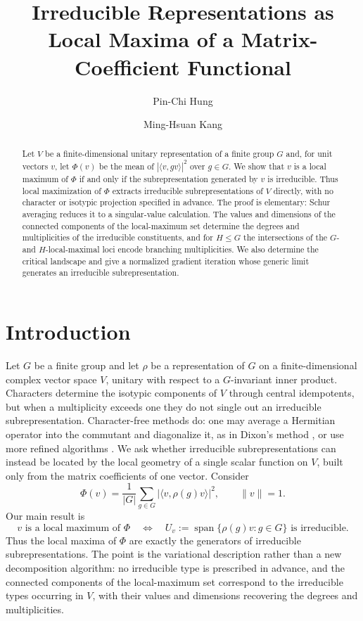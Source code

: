 \documentclass{amsart}
\title[Irreducible representations as local maxima]{Irreducible Representations as Local Maxima of a Matrix-Coefficient Functional}
\author{Pin-Chi Hung}
\author{Ming-Hsuan Kang}
\theoremstyle{remark}
\DeclareMathOperator{\Span}{span}
\newcommand{\norm}[1]{\lVert #1\rVert}
\begin{document}
 
\begin{abstract}
Let $V$ be a finite-dimensional unitary representation of a finite group $G$ and, for unit vectors
$v$, let $\Phi(v)$ be the mean of $|\langle v,gv\rangle|^2$ over $g\in G$. We show that $v$ is a local
maximum of $\Phi$ if and only if the subrepresentation generated by $v$ is irreducible. Thus local
maximization of $\Phi$ extracts irreducible subrepresentations of $V$ directly, with no character or
isotypic projection specified in advance. The proof is elementary: Schur averaging reduces it to a
singular-value calculation.
The values and dimensions of the connected components of the local-maximum set determine the degrees
and multiplicities of the irreducible constituents, and for $H\le G$ the intersections of the $G$- and $H$-local-maximal loci
encode branching multiplicities. We also determine the critical landscape and give a normalized
gradient iteration whose generic limit generates an irreducible subrepresentation.
\end{abstract}
\maketitle
 
\section{Introduction}
 
Let $G$ be a finite group and let $\rho$ be a representation of $G$ on a finite-dimensional complex
vector space $V$, unitary with respect to a $G$-invariant inner product. Characters determine the
isotypic components of $V$ through central idempotents, but when a multiplicity exceeds one they do
not single out an irreducible subrepresentation. Character-free methods do: one may average a
Hermitian operator into the commutant and diagonalize it, as in Dixon's method \cite{Dixon1970}, or
use more refined algorithms \cite{BabaiRonyai1990}. We ask whether irreducible subrepresentations can
instead be located by the local geometry of a single scalar function on $V$, built only from the
matrix coefficients of one vector. Consider
\begin{equation}\label{eq:Phi}
    \Phi(v)=\frac1{|G|}\sum_{g\in G}\bigl|\langle v,\rho(g)v\rangle\bigr|^2,
    \qquad \norm{v}=1.
\end{equation}
Our main result is
\begin{equation}\label{eq:main-intro}
 v\text{ is a local maximum of }\Phi
 \quad\Longleftrightarrow\quad
 U_v:=\Span\{\rho(g)v:g\in G\}\text{ is irreducible}.
\end{equation}
Thus the local maxima of $\Phi$ are exactly the generators of irreducible subrepresentations. The
point is the variational description rather than a new
decomposition algorithm: no irreducible type is prescribed in advance, and the connected components
of the local-maximum set correspond to the irreducible types occurring in $V$, with their values and
dimensions recovering the degrees and multiplicities.
 
\end{document}

